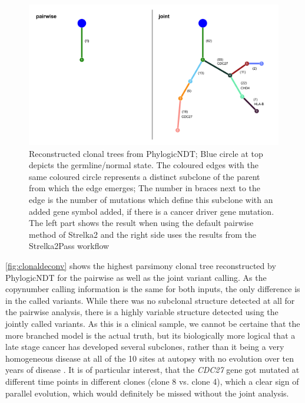 \begin{figure}[!ht]
\centering
\includegraphics[width=.99\linewidth]{Figures/clonalDeconv.pdf}
\caption[Reconstructed clonal trees for joint and pairwise variant calling]{Reconstructed clonal trees from PhylogicNDT; Blue circle at top depicts the germline/normal state. The coloured edges with the same coloured circle represents a distinct subclone of the parent from which the edge emerges; The number in braces next to the edge is the number of mutations which define this subclone with an added gene symbol added, if there is a cancer driver gene mutation. The left part shows the result when using the default pairwise method of Strelka2 and the right side uses the results from the Strelka2Pass workflow}\label{fig:clonaldeconv}
\end{figure}


\autoref{fig:clonaldeconv} shows the highest parsimony clonal tree reconstructed by PhylogicNDT for the pairwise as well as the joint variant calling. As the copynumber calling information is the same for both inputs, the only difference is in the called variants. While there was no subclonal structure detected at all for the pairwise analysis, there is a highly variable structure detected using the jointly called variants. As this is a clinical sample, we cannot be certaine that the more branched model is the actual truth, but its biologically more logical that a late stage cancer has developed several subclones, rather than it being a very homogeneous disease at all of the 10 sites at autopsy with no evolution over ten years of disease \cite{Gerstung2020}.
It is of particular interest, that the \textit{CDC27} gene got mutated at different time points in different clones (clone 8 vs. clone 4), which a clear sign of parallel evolution, which would definitely be missed without the joint analysis.


